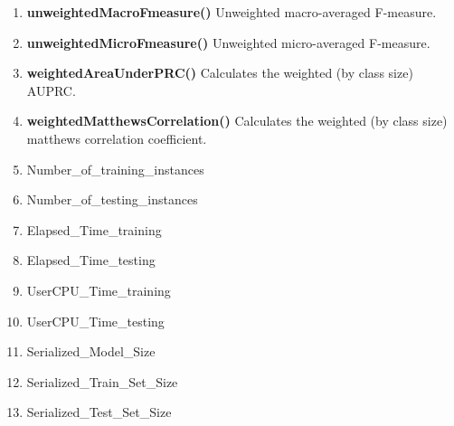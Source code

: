 \documentclass[a4paper,12pt, english]{article}
\begin{document}
\begin{enumerate}
\item \textbf{unweightedMacroFmeasure()}
          Unweighted macro-averaged F-measure.
          
\item \textbf{unweightedMicroFmeasure()}
          Unweighted micro-averaged F-measure.          

\item \textbf{weightedAreaUnderPRC()}
          Calculates the weighted (by class size) AUPRC.


          
\item \textbf{weightedMatthewsCorrelation()}
          Calculates the weighted (by class size) matthews correlation coefficient.
          
\item Number\_of\_training\_instances

\item Number\_of\_testing\_instances          

\item Elapsed\_Time\_training

\item Elapsed\_Time\_testing

\item UserCPU\_Time\_training

\item UserCPU\_Time\_testing
    
\item Serialized\_Model\_Size

\item Serialized\_Train\_Set\_Size

\item Serialized\_Test\_Set\_Size
	    
\end{enumerate}



    
\end{document}
